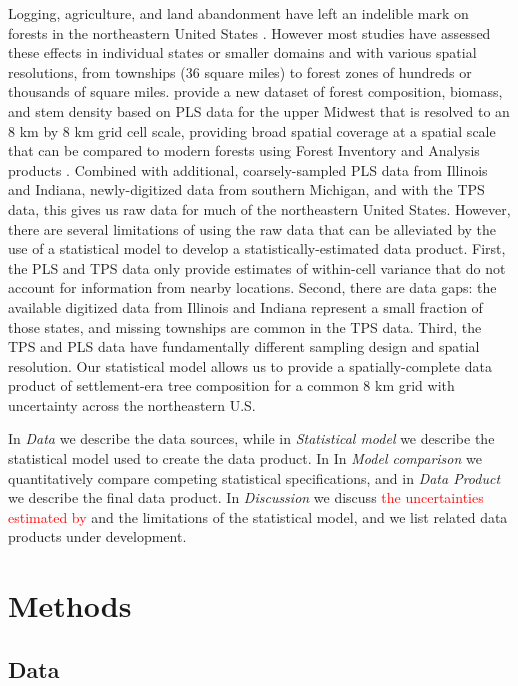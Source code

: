 \documentclass[10pt,letterpaper]{article}
\begin{document}
Logging, agriculture, and land abandonment have left an indelible
mark on forests in the northeastern United States \cite{foster1998land,rhemtulla2009legacies,thompson2013four,goring2015composition}.
However most studies have assessed these effects in individual states
or smaller domains \cite{friedman2005regional,rhemtulla2009historical}
and with various spatial resolutions, from townships (36 square miles)
to forest zones of hundreds or thousands of square miles. \cite{goring2015composition}
provide a new dataset of forest composition, biomass, and stem density
based on PLS data for the upper Midwest that is resolved to an 8 km
by 8 km grid cell scale, providing broad spatial coverage at a spatial
scale that can be compared to modern forests using Forest Inventory
and Analysis products \cite{gray2012forest}. Combined with additional,
coarsely-sampled PLS data from Illinois and Indiana, newly-digitized
data from southern Michigan, and with the TPS data, this gives us
raw data for much of the northeastern United States. However, there
are several limitations of using the raw data that can be alleviated
by the use of a statistical model to develop a statistically-estimated
data product. First, the PLS and TPS data only provide estimates of
within-cell variance that do not account for information from nearby
locations. Second, there are data gaps: the available digitized data
from Illinois and Indiana represent a small fraction of those states,
and missing townships are common in the TPS data. Third, the TPS and
PLS data have fundamentally different sampling design and spatial
resolution. Our statistical model allows us to provide a spatially-complete
data product of settlement-era tree composition for a common 8 km
grid with uncertainty across the northeastern U.S.

In \emph{Data} we describe the data sources, while in \emph{Statistical model} we describe 
the statistical model used to create the data product. In In \emph{Model comparison}
 we quantitatively compare competing
statistical specifications, and in \emph{Data Product}
we describe the final data product. In \emph{Discussion}
we discuss \textcolor{red}{the uncertainties estimated by }and the
limitations of the statistical model, and we list related data products
under development.

\section*{Methods}

\subsection*{Data\label{sec:Data}}
\end{document}
